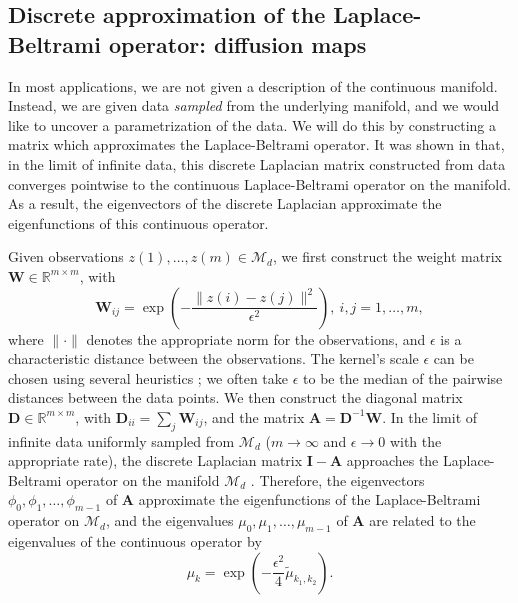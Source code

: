 \subsection{Discrete approximation of the Laplace-Beltrami operator: diffusion maps}

In most applications, we are not given a description of the continuous manifold.
%
Instead, we are given data {\em sampled} from the underlying manifold, and we would like to uncover a parametrization of the data.
%
We will do this by constructing a matrix which approximates the Laplace-Beltrami operator.
%
It was shown in \cite{coifman2006geometric} that, in the limit of infinite data, this discrete Laplacian matrix constructed from data converges pointwise to the continuous Laplace-Beltrami operator on the manifold.
%
As a result, the eigenvectors of the discrete Laplacian approximate the eigenfunctions of this continuous operator.

Given observations $z(1), \dots, z(m) \in \mathcal{M}_d$, we first construct the weight matrix $\mathbf{W} \in \mathbb{R}^{m \times m}$, with
\begin{equation} \label{eq:W}
\mathbf{W}_{ij} = \exp \left( -\frac{\|z(i) - z(j) \|^2}{\epsilon^2} \right), \ i,j=1,\ldots,m,
\end{equation}
where $\| \cdot \|$ denotes the appropriate norm for the observations, and $\epsilon$ is a characteristic distance between the observations.
%
The kernel's scale $\epsilon$ can be chosen using several heuristics \cite{coifman2008graph, rohrdanz2011determination}; we often take $\epsilon$ to be the median of the pairwise distances between the data points.
%
We then construct the diagonal matrix $\mathbf{D} \in \mathbb{R}^{m \times m}$, with $\mathbf{D}_{ii} = \sum_j \mathbf{W}_{ij}$, and the matrix $\mathbf{A}  = \mathbf{D}^{-1} \mathbf{W}.$
%
In the limit of infinite data uniformly sampled from $\mathcal{M}_d$ ($m \rightarrow \infty$ and $\epsilon \rightarrow 0$ with the appropriate rate), the discrete Laplacian matrix $\mathbf{I}-\mathbf{A}$ approaches the Laplace-Beltrami operator on the manifold $\mathcal{M}_d$ \cite{coifman2006geometric}.
%
Therefore, the eigenvectors $\phi_0, \phi_1, \dots, \phi_{m-1}$ of $\mathbf{A}$ approximate the eigenfunctions of the Laplace-Beltrami operator on $\mathcal{M}_d$,
and the eigenvalues $\mu_0, \mu_1, \dots, \mu_{m-1}$ of $\mathbf{A}$ are related to the eigenvalues of the continuous operator by
\begin{equation} \label{eq:evals_relationship}
\mu_k = \exp \left( -\frac{\epsilon^2}{4} \tilde{\mu}_{k_1, k_2}  \right).
\end{equation}

